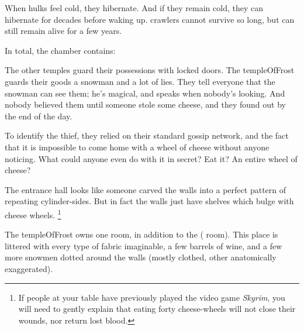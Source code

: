 \begin{multicols}{2}

When \glspl{hulk} feel cold, they hibernate.
And if they remain cold, they can hibernate for decades before waking up.
\Glspl{crawler} cannot survive so long, but can still remain alive for a few years.

In total, the chamber contains:

\chitincrawler

\chitincrawler



\basilisk

\dragon

\showStdSpells



\begin{exampletext}
  The other \glspl{temple} guard their possessions with locked doors.
  The \gls{templeOfFrost} guards their goods a snowman and a lot of lies.
  They tell everyone that the snowman can see them; he's magical, and speaks when nobody's looking.
  And nobody believed them until someone stole some cheese, and they found out by the end of the day.

  To identify the thief, they relied on their standard gossip network, and the fact that it is impossible to come home with a wheel of cheese without anyone noticing.
  What could anyone even do with it in secret?
  Eat it?
  An entire wheel of cheese?
\end{exampletext}

The entrance hall looks like someone carved the walls into a perfect pattern of repeating cylinder-sides.
But in fact the walls just have shelves which bulge with cheese wheels.%
\footnote{If people at your table have previously played the video game \textit{Skyrim}, you will need to gently explain that eating forty cheese-wheels will not close their wounds, nor return lost blood.}


The \gls{templeOfFrost} owns one room, in addition to the  ( room).
This place is littered with every type of fabric imaginable, a few barrels of wine, and a few more snowmen dotted around the walls (mostly clothed, other anatomically exaggerated).


\end{multicols}

